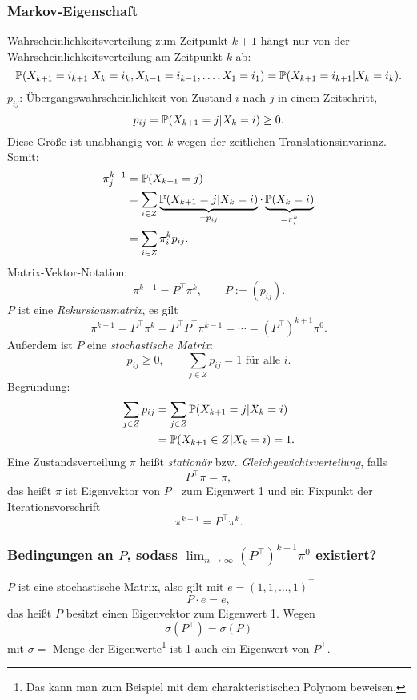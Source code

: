 \subsubsection*{Markov-Eigenschaft}
Wahrscheinlichkeitsverteilung zum Zeitpunkt $k+1$ hängt nur von der
Wahrscheinlichkeitsverteilung am Zeitpunkt $k$ ab:
\[ \mathbb{P}( X_{k+1} = i_{k+1} | X_k = i_k, X_{k-1} = i_{k-1}, \ldots, X_1 = i_1)
  = \mathbb{P}( X_{k+1} = i_{k+1} | X_k = i_k ). \]
$p_{ij}$: Übergangswahrscheinlichkeit von Zustand $i$ nach $j$ in einem
Zeitschritt,
\[ p_{ij} = \mathbb{P}( X_{k+1} = j | X_k = i ) \ge 0. \]
Diese Größe ist unabhängig von $k$ wegen der zeitlichen Translationsinvarianz.
Somit:
\begin{align*}
  \pi_j^{k+1}
  &= \mathbb{P} (X_{k+1} = j) \\
  &= \sum_{i \in Z} \underbrace{\mathbb{P}(X_{k+1} = j | X_k = i)}_{=p_{ij}} \cdot
    \underbrace{\mathbb{P}(X_k = i)}_{= \pi_i^k} \\
  &= \sum_{i \in Z} \pi_i^k p_{ij}.
\end{align*}
Matrix-Vektor-Notation:
\[ \pi^{k-1} = P^\top \pi^k, \qquad P := (p_{ij}). \]
$P$ ist eine \emph{Rekursionsmatrix}, es gilt
\[ \pi^{k+1} = P^\top \pi^k = P^\top P^\top \pi^{k-1} = \cdots = (P^\top)^{k+1}
  \pi^0. \]
Außerdem ist $P$ eine \emph{stochastische Matrix}:
\[ p_{ij} \ge 0, \qquad \sum_{j \in Z} p_{ij} = 1 \text{ für alle } i. \]
Begründung:
\begin{align*}
  \sum_{j \in Z} p_{ij}
  &= \sum_{j \in Z} \mathbb{P}( X_{k+1} = j | X_k = i ) \\
  &= \mathbb{P}( X_{k+1} \in Z | X_k = i ) = 1.
\end{align*}
Eine Zustandsverteilung $\pi$ heißt \emph{stationär} bzw.
\emph{Gleichgewichtsverteilung}, falls
\[ P^\top \pi = \pi, \]
das heißt $\pi$ ist Eigenvektor von $P^\top$ zum Eigenwert 1 und ein Fixpunkt
der Iterationsvorschrift
\[ \pi^{k+1} = P^\top \pi^k. \]

\subsubsection*{Bedingungen an $P$, sodass
  $\lim_{n \to \infty} (P^\top)^{k+1} \pi^0$ existiert?}
$P$ ist eine stochastische Matrix, also gilt mit $e = (1, 1, \ldots, 1)^\top$
\[ P \cdot e = e, \]
das heißt $P$ besitzt einen Eigenvektor zum Eigenwert 1. Wegen
\[ \sigma( P^\top ) = \sigma( P ) \]
mit $\sigma =$ Menge der Eigenwerte\footnote{%
  Das kann man zum Beispiel mit dem charakteristischen Polynom beweisen.
} ist 1 auch ein Eigenwert von $P^\top$.

